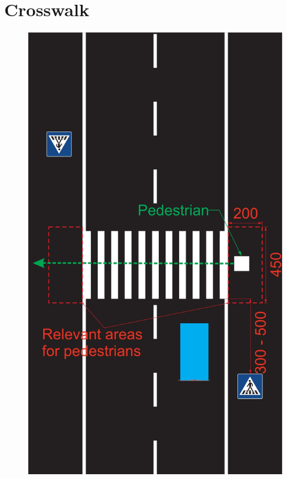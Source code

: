 \section{Crosswalk}
\label{fig_crosswalk}
\begin{figure}[H]
	\begin{center}
		\centering\includegraphics[]{graphics/Abb_9_crosswalk.jpg}
	\end{center}
\end{figure}
\newpage

